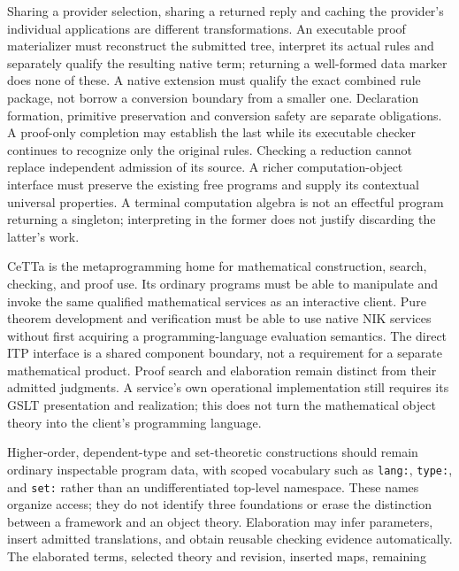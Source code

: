 \documentclass[11pt]{article}
\theoremstyle{definition}
\theoremstyle{remark}
\begin{document}
\begin{description}[leftmargin=1.2cm,style=nextline]
  Sharing a provider selection, sharing a returned reply and caching the
  provider's individual applications are different transformations.
  An executable proof materializer must reconstruct the submitted tree,
  interpret its actual rules and separately qualify the resulting native
  term; returning a well-formed data marker does none of these.
  A native extension must qualify the exact combined rule package, not borrow
  a conversion boundary from a smaller one. Declaration formation, primitive
  preservation and conversion safety are separate obligations. A proof-only
  completion may establish the last while its executable checker continues
  to recognize only the original rules. Checking a reduction cannot replace
  independent admission of its source.
  A richer computation-object interface must preserve the existing free
  programs and supply its contextual universal properties. A terminal
  computation algebra is not an effectful program returning a singleton;
  interpreting in the former does not justify discarding the latter's work.
\item[KG8: Integrated mathematical entry.]
  CeTTa is the metaprogramming home for mathematical construction, search,
  checking, and proof use. Its ordinary programs must be able to manipulate
  and invoke the same qualified mathematical services as an interactive client.
  Pure theorem development and verification must be able to use native NIK
  services without first acquiring a programming-language evaluation semantics.
  The direct ITP interface is a shared component boundary, not a requirement
  for a separate mathematical product. Proof search and elaboration remain distinct
  from their admitted judgments. A service's own operational implementation
  still requires its GSLT presentation and realization; this does not turn
  the mathematical object theory into the client's programming language.
\item[KG9: Homoiconic integration with qualified elaboration.]
  Higher-order, dependent-type and set-theoretic constructions should remain
  ordinary inspectable program data, with scoped vocabulary such as
  \nolinkurl{lang:}, \nolinkurl{type:}, and \nolinkurl{set:} rather than an
  undifferentiated top-level namespace. These names organize access; they do
  not identify three foundations or erase the distinction between a framework
  and an object theory. Elaboration may infer parameters, insert admitted
  translations, and obtain reusable checking evidence automatically. The
  elaborated terms, selected theory and revision, inserted maps, remaining

\end{description}
\end{document}
